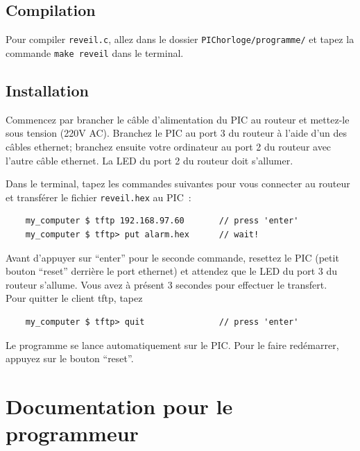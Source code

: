 \documentclass[12pt,a4paper]{article}
\begin{document}
\subsection{Compilation}
Pour compiler \texttt{reveil.c}, allez dans le dossier \texttt{PIChorloge/programme/} et tapez la commande \texttt{make reveil} dans le terminal.

\subsection{Installation}
Commencez par brancher le câble d'alimentation du PIC au routeur et mettez-le sous tension (220V AC). Branchez le PIC au port 3 du routeur à l'aide d'un des câbles ethernet; branchez ensuite votre ordinateur au port 2 du routeur avec l'autre câble ethernet. La LED du port 2 du routeur doit s'allumer.

Dans le terminal, tapez les commandes suivantes pour vous connecter au routeur et transférer le fichier \texttt{reveil.hex} au PIC~:
\begin{verbatim}
    my_computer $ tftp 192.168.97.60       // press 'enter'
    my_computer $ tftp> put alarm.hex      // wait!
\end{verbatim}
Avant d'appuyer sur ``enter'' pour le seconde commande, resettez le PIC (petit bouton ``reset'' derrière le port ethernet) et attendez que le LED du port 3 du routeur s'allume. Vous avez à présent 3 secondes pour effectuer le transfert.\\
Pour quitter le client tftp, tapez
\begin{verbatim}
    my_computer $ tftp> quit               // press 'enter'
\end{verbatim}
Le programme se lance automatiquement sur le PIC. Pour le faire redémarrer, appuyez sur le bouton ``reset''.


\section{Documentation pour le programmeur}
    
\end{document}
